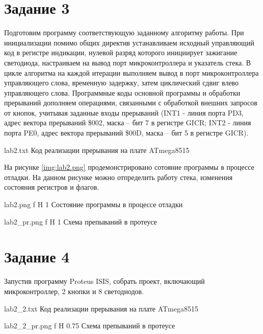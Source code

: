 \documentclass{bmstu}
\begin{document}
\section{Задание 3}
Подготовим  программу соответствующую заданному алгоритму работы. При инициализации помимо общих директив устанавливаем исходный управляющий код в регистре индикации,  нулевой разряд которого инициирует зажигание светодиода, настраиваем  на вывод порт  микроконтроллера и указатель стека.
В цикле алгоритма на каждой итерации выполняем вывод в порт микроконтроллера управляющего слова, временную задержку, затем циклический сдвиг влево управляющего слова. 
Программные коды основной программы и обработки прерываний дополняем операциями, связанными с обработкой внешних запросов от кнопок, учитывая заданные входы прерываний (INT1 - линия порта PD3, адрес вектора прерываний \$002, маска – бит 7 в регистре GICR; INT2 - линия порта PE0, адрес вектора прерываний \$00D, маска – бит 5 в регистре GICR). 

	{lab2.txt}
	{Код реализации прерывания на плате ATmega8515}

На рисунке \ref{img:lab2.png} продемонстрировано сотояние программы в процессе отладки. На данном рисунке можно отпределить работу стека, изменения состояния регистров и флагов.

    {lab2.png} %
    {f} %
    {H} %
    {1\textwidth} %
    {Состояние программы в процессе отладки} 
    

    {lab2_pr.png} %
    {f} %
    {H} %
    {1\textwidth} %
    {Схема препываний в протеусе} %

\newpage
\section{Задание 4}
Запустив программу Proteus ISIS, собрать проект, включающий микроконтроллер, 2 кнопки и 8 светодиодов.


	{lab2_2.txt}
	{Код реализации прерывания на плате ATmega8515}

    {lab2_2_pr.png} %
    {f} %
    {H} %
    {0.75\textwidth} %
    {Схема препываний в протеусе} %
\end{document}
